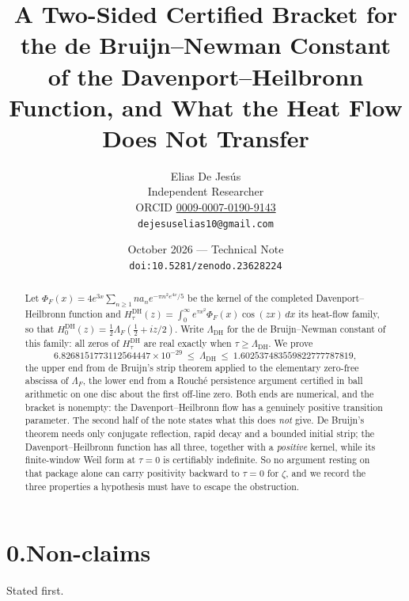 \documentclass[11pt,a4paper]{article}
\title{\bfseries A Two-Sided Certified Bracket for the de Bruijn--Newman Constant
of the Davenport--Heilbronn Function, and What the Heat Flow Does Not Transfer}
\author{Elias De Jes\'us\\[2pt]
{\small Independent Researcher}\\[1pt]
{\small ORCID \href{https://orcid.org/0009-0007-0190-9143}{0009-0007-0190-9143}}\\[1pt]
{\small \texttt{dejesuselias10@gmail.com}}}
\date{October 2026 --- Technical Note\\[2pt]
{\small\texttt{doi:10.5281/zenodo.23628224}}}
\theoremstyle{remark}
\newcommand{\LamDH}{\Lambda_{\mathrm{DH}}}
\newcommand{\PhiF}{\Phi_F}
\newcommand{\HDH}{H^{\mathrm{DH}}}
\begin{document}
\maketitle

\begin{abstract}
\noindent
Let $\PhiF(x)=4e^{3x}\sum_{n\ge1}na_ne^{-\pi n^2e^{4x}/5}$ be the kernel of the completed
Davenport--Heilbronn function and $\HDH_\tau(z)=\int_0^\infty e^{\tau x^2}\PhiF(x)\cos(zx)\,dx$
its heat-flow family, so that $\HDH_0(z)=\tfrac12\Lambda_F(\tfrac12+iz/2)$. Write $\LamDH$
for the de Bruijn--Newman constant of this family: all zeros of $\HDH_\tau$ are real exactly
when $\tau\ge\LamDH$. We prove
\[
  6.8268151773112564447\times10^{-29}\ \le\ \LamDH\ \le\ 1.602537483559822777787819 ,
\]
the upper end from de Bruijn's strip theorem applied to the elementary zero-free abscissa of
$\Lambda_F$, the lower end from a Rouch\'e persistence argument certified in ball arithmetic
on one disc about the first off-line zero. Both ends are numerical, and the bracket is
nonempty: the Davenport--Heilbronn flow has a genuinely positive transition parameter. The
second half of the note states what this does \emph{not} give. De Bruijn's theorem needs
only conjugate reflection, rapid decay and a bounded initial strip; the Davenport--Heilbronn
function has all three, together with a \emph{positive} kernel, while its finite-window Weil
form at $\tau=0$ is certifiably indefinite. So no argument resting on that package alone can
carry positivity backward to $\tau=0$ for $\zeta$, and we record the three properties a
hypothesis must have to escape the obstruction.
\end{abstract}

\section*{0.\quad Non-claims}

Stated first.
\end{document}
